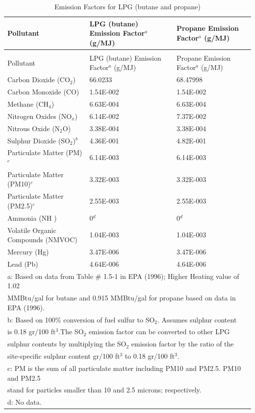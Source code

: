 \begin{longtable}[c]{p{3.0in}p{1.5in}p{1.5in}}
\caption{Emission Factors for LPG (butane and propane) \label{table:emission-factors-for-lpg-butane-and-propane}} \tabularnewline
\toprule 
Pollutant & LPG (butane) Emission Factor\(^a\)    (g/MJ) & Propane Emission Factor\(^a\)    (g/MJ) \tabularnewline
\midrule
\endfirsthead

\caption[]{Emission Factors for LPG (butane and propane)} \tabularnewline
\toprule 
Pollutant & LPG (butane) Emission Factor\(^a\)    (g/MJ) & Propane Emission Factor\(^a\)    (g/MJ) \tabularnewline
\midrule
\endhead

Carbon Dioxide (CO\(_2\)) & 66.0233 & 68.47998 \tabularnewline
Carbon Monoxide (CO) & 1.54E-002 & 1.54E-002 \tabularnewline
Methane (CH\(_4\)) & 6.63E-004 & 6.63E-004 \tabularnewline
Nitrogen Oxides (NO\(_x\)) & 6.14E-002 & 7.37E-002 \tabularnewline
Nitrous Oxide (N\(_2\)O) & 3.38E-004 & 3.38E-004 \tabularnewline
Sulphur Dioxide (SO\(_2\))\(^b\) & 4.36E-001 & 4.82E-001 \tabularnewline
Particulate Matter (PM)\(^c\) & 6.14E-003 & 6.14E-003 \tabularnewline
Particulate Matter (PM10)\(^c\) & 3.32E-003 & 3.32E-003 \tabularnewline
Particulate Matter (PM2.5)\(^c\) & 2.55E-003 & 2.55E-003 \tabularnewline
Ammonia (NH  ) & 0\(^d\) & 0\(^d\) \tabularnewline
Volatile Organic Compounds (NMVOC) & 1.04E-003 & 1.04E-003 \tabularnewline
Mercury (Hg) & 3.47E-006 & 3.47E-006 \tabularnewline
Lead (Pb) & 4.64E-006 & 4.64E-006 \tabularnewline
\midrule
\multicolumn{3}{l}{a: Based on data from Table \# 1.5-1 in EPA (1996); Higher Heating value of 1.02} \tabularnewline
\multicolumn{3}{l}{MMBtu/gal for butane and 0.915 MMBtu/gal for propane based on data in EPA (1996).} \tabularnewline
\multicolumn{3}{l}{b: Based on 100\% conversion of fuel sulfur to SO\(_2\). Assumes sulphur content} \tabularnewline
\multicolumn{3}{l}{is 0.18 gr/100 ft\(^3\).The SO\(_2\) emission factor can be converted to other LPG} \tabularnewline
\multicolumn{3}{l}{sulphur contents by multiplying the SO\(_2\) emission factor by the ratio of the} \tabularnewline
\multicolumn{3}{l}{site-specific sulphur content gr/100 ft\(^3\) to 0.18 gr/100 ft\(^3\).} \tabularnewline
\multicolumn{3}{l}{c: PM is the sum of all particulate matter including PM10 and PM2.5. PM10 and PM2.5} \tabularnewline
\multicolumn{3}{l}{stand for particles smaller than 10 and 2.5 microns; respectively.} \tabularnewline
\multicolumn{3}{l}{d: No data.} \tabularnewline
\bottomrule
\end{longtable}

